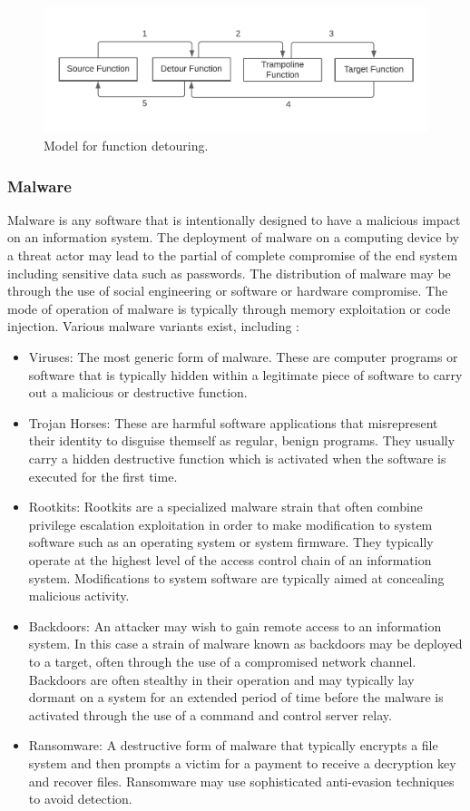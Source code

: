 \begin{figure}[H]
\centering
\includegraphics[width=0.8\columnwidth]{Figures/Fig_63.png}
\caption{Model for function detouring.  }
\label{fig:gantt}
\end{figure}

\subsubsection{Malware}

Malware is any software that is intentionally designed to have a malicious impact on an information system. The deployment of malware on a computing device by a threat actor may lead to the partial of complete compromise of the end system including sensitive data such as passwords. The distribution of malware may be through the use of social engineering or software or hardware compromise. The mode of operation of malware is typically through memory exploitation or code injection. Various malware variants exist, including \cite{malware}:

\begin{itemize}
  \item Viruses: The most generic form of malware. These are computer programs or software that is typically hidden within a legitimate piece of software to carry out a malicious or destructive function. 
  \item Trojan Horses: These are harmful software applications that misrepresent their identity to disguise themself as regular, benign programs. They usually carry a hidden destructive function which is activated when the software is executed for the first time.
   \item Rootkits: Rootkits are a specialized malware strain that often combine privilege escalation exploitation in order to make modification to system software such as an operating system or system firmware. They typically operate at the highest level of the access control chain of an information system. Modifications to system software are typically aimed at concealing malicious activity.
  \item Backdoors: An attacker may wish to gain remote access to an information system. In this case a strain of malware known as backdoors may be deployed to a target, often through the use of a compromised network channel. Backdoors are often stealthy in their operation and may typically lay dormant on a system for an extended period of time before the malware is activated through the use of a command and control server relay.
  \item Ransomware: A destructive form of malware that typically encrypts a file system and then prompts a victim for a payment to receive a decryption key and recover files. Ransomware may use sophisticated anti-evasion techniques to avoid detection.
  \end{itemize}
  
